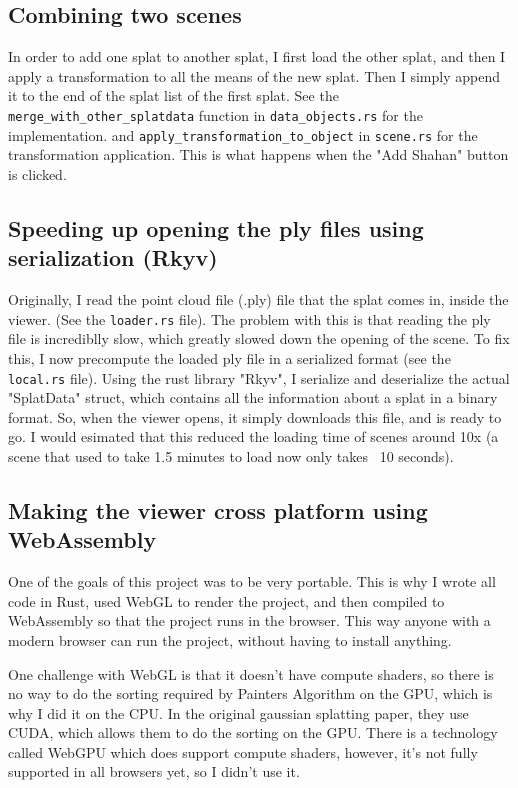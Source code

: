 \documentclass {article}
\begin{document}
\subsection{Combining two scenes}
In order to add one splat to another splat, I first load the other splat, and then I apply a transformation to all the means of the new splat. Then I simply append it to the end of the splat list of the first splat. See the \lstinline[style=inlinecode]{merge_with_other_splatdata} function in \lstinline[style=inlinecode]{data_objects.rs} for the implementation. and \lstinline[style=inlinecode]{apply_transformation_to_object} in \lstinline[style=inlinecode]{scene.rs} for the transformation application. This is what happens when the "Add Shahan" button is clicked.

\subsection{Speeding up opening the ply files using serialization (Rkyv)}
Originally, I read the point cloud file (.ply) file that the splat comes in, inside the viewer. (See the \lstinline[style=inlinecode]{loader.rs} file). The problem with this is that reading the ply file is incrediblly slow, which greatly slowed down the opening of the scene. To fix this, I now precompute the loaded ply file in a serialized format (see the \lstinline[style=inlinecode]{local.rs} file). Using the rust library "Rkyv", I serialize and deserialize the actual "SplatData" struct, which contains all the information about a splat in a binary format. So, when the viewer opens, it simply downloads this file, and is ready to go. I would esimated that this reduced the loading time of scenes around 10x (a scene that used to take 1.5 minutes to load now only takes ~10 seconds).


\subsection{Making the viewer cross platform using WebAssembly}
One of the goals of this project was to be very portable. This is why I wrote all code in Rust, used WebGL to render the project, and then compiled to WebAssembly so that the project runs in the browser. This way anyone with a modern browser can run the project, without having to install anything.

One challenge with WebGL is that it doesn't have compute shaders, so there is no way to do the sorting required by Painters Algorithm on the GPU, which is why I did it on the CPU. In the original gaussian splatting paper, they use CUDA, which allows them to do the sorting on the GPU. There is a technology called WebGPU which does support compute shaders, however, it's not fully supported in all browsers yet, so I didn't use it.
\end{document}
